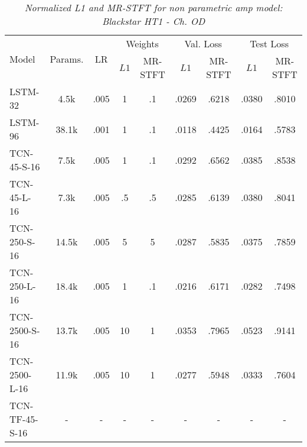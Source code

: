 \setlength{\tabcolsep}{4pt}
\begin{table*}[h]
    \centering
    \small
    \caption{\textit{Normalized L1 and MR-STFT for non parametric amp model: Blackstar HT1 - Ch. OD}}
    \begin{tabular}{lcccccccc}
        \toprule
        \multirow{2}{*}{Model}
            & \multirow{2}{*}{Params.}
                & \multirow{2}{*}{LR}
                    & \multicolumn{2}{c}{Weights}
                        & \multicolumn{2}{c}{Val. Loss} 
                            & \multicolumn{2}{c}{Test Loss} \\ 
        \cmidrule(lr){4-5} 
            \cmidrule(lr){6-7} 
                \cmidrule(lr){8-9} 
        &   &   & $L1$ & MR-STFT & $L1$ & MR-STFT & $L1$ & MR-STFT \\ 
        \midrule
        LSTM-32
            & 4.5k  & .005 & 1 & .1 & .0269 & .6218 & .0380 & .8010 \\
        LSTM-96       
            & 38.1k & .001 & 1 & .1 & .0118 & .4425 & .0164 & .5783 \\
        \midrule
        TCN-45-S-16               
            & 7.5k & .005 & 1 & .1 & .0292 & .6562 & .0385 & .8538 \\ 
        TCN-45-L-16               
            & 7.3k & .005 & .5 & .5 & .0285 & .6139 & .0380 & .8041 \\
        TCN-250-S-16               
            & 14.5k & .005 & 5 & 5 & .0287 & .5835 & .0375 & .7859 \\ 
        TCN-250-L-16               
            & 18.4k & .005 & 1 & .1 & .0216 & .6171 & .0282 & .7498 \\
        TCN-2500-S-16               
            & 13.7k & .005 & 10 & 1 & .0353 & .7965 & .0523 & .9141 \\ 
        TCN-2500-L-16               
            & 11.9k & .005 & 10 & 1 & .0277 & .5948 & .0333 & .7604 \\
        \midrule
        TCN-TF-45-S-16               
            & - & - & - & - & - & - & - & - \\

\end{tabular}
\end{table*}
